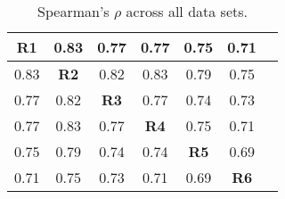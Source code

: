 \begin{table}
  \begin{tabular}{|c|*{6}{c|}}
    \toprule
    \textbf{R1} & 0.83 & 0.77 & 0.77 & 0.75 & 0.71 \\ \midrule
    0.83 & \textbf{R2} & 0.82 & 0.83 & 0.79 & 0.75 \\ \midrule
    0.77 & 0.82 & \textbf{R3} & 0.77 & 0.74 & 0.73 \\ \midrule
    0.77 & 0.83 & 0.77 & \textbf{R4} & 0.75 & 0.71 \\ \midrule
    0.75 & 0.79 & 0.74 & 0.74 & \textbf{R5} & 0.69 \\ \midrule
    0.71 & 0.75 & 0.73 & 0.71 & 0.69 & \textbf{R6} \\ \midrule
  \end{tabular}
  \caption{Spearman's $\rho$ across all data sets.}
\label{tab:correlations}
\end{table}


